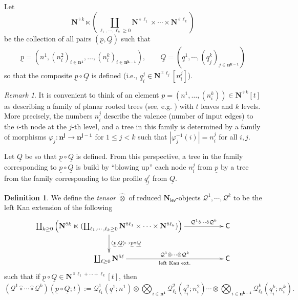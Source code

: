 \documentclass[11pt]{amsart}
\theoremstyle{definition}
\newtheorem{definition}[subsection]{Definition}
\theoremstyle{remark}
\newtheorem{remark}[subsection]{Remark}
\newcommand{\Cal}[1]{\mathcal{#1}}
\newcommand{\Ncirc}[1]{\mathbf{N}^{\hat{\circ}#1}}
\newcommand{\circhat}{\hat{\circ}}
\newcommand{\tensorhat}{\hat{\otimes}}
\newcommand{\Nl}{\mathbf{N}_{\mathsf{lev}}}
\begin{document}
Let \[\Ncirc{k} \ltimes \left(\coprod_{\ell_1,\cdots,\ell_k\geq 0}\Ncirc{\ell_1} \times \cdots \times \Ncirc{\ell_k}\right)\] be the collection of all pairs $(\underline{p}, \underline{Q})$ such that 
\begin{align*} 
\underline{p}=(n^1,(n^2_i)_{i\in\mathbf{n^1}},\dots,(n^k_i)_{i\in\mathbf{n^{k-1}}}), \quad \quad
\underline{Q}=(\underline{q}^1,\cdots ,(\underline{q}^k_j)_{j\in \mathbf{n^{k-1}}})
\end{align*}
so that the composite $\underline{p} \circ \underline{Q}$ is defined (i.e., $\underline{q}^j_i\in \Ncirc{\ell_j}[n^j_i]$).  

\begin{remark} \label{rem:trees-n-stuff}
    It is convenient to think of an element $\underline{p}=(n^1,\dots,(n^k_i))\in \Ncirc{k}[t]$ as describing a family of planar rooted trees (see, e.g. \cite{Ching-thesis}) with $t$ leaves and $k$ levels. More precisely, the numbers $n^j_i$ describe the valence (number of input edges) to the $i$-th node at the $j$-th level, and a tree in this family is determined by a family of morphisms $\varphi_j \colon \mathbf{n^j}\to\mathbf{n^{j-1}}$ for $1\leq j < k$ such that $|\varphi_j^{-1}(i)|=n_i^j$ for all $i,j$. %
    
    Let $\underline{Q}$ be so that $\underline{p}\circ \underline{Q}$ is defined. From this perspective, a tree in the family corresponding to $\underline{p}\circ\underline{Q}$ is build by ``blowing up'' each node $n^j_i$ from $\underline{p}$ by a tree from the family corresponding to the profile $\underline{q^j_i}$ from $\underline{Q}$.
\end{remark}

\begin{definition} \label{def:tensor} We define the \textit{tensor $\tensorhat$} of reduced $\Nl$-objects $\Cal{Q}^1,\cdots,\Cal{Q}^k$ to be the left Kan extension of the following \begin{equation} \xymatrix{ 
    \coprod_{k\geq 0} \left( \Ncirc{k} \ltimes (\coprod_{\ell_1,\cdots,\ell_k\geq 0}\Ncirc{\ell_1} \times \cdots \times \Ncirc{\ell_k}) \right) \ar[rr]^-{\Cal{Q}^1 \circhat \cdots \circhat \Cal{Q}^k} \ar[d]^-{(\underline{p}, \underline{Q}) \mapsto \underline{p} \circ \underline{Q}} 
    && \mathsf{C} 
    \\ \coprod_{\ell\geq 0} \mathbf{N}^{\circhat \ell} \ar[rr]^-{\Cal{Q}^1 \tensorhat \cdots \tensorhat \Cal{Q}^k}_-{\text{left Kan ext.}} 
    && \mathsf{C} }\end{equation}
such that if $\underline{p}\circ \underline{Q}\in \Ncirc{\ell_1+\cdots+\ell_k}[t]$, then \[  (\Cal{Q}^1 \circhat \cdots \circhat \Cal{Q}^k)(\underline{p}\circ \underline{Q}; t) :=  \Cal{Q}_{\ell_1}^1 (\underline{q}^1;n^1) \otimes \bigotimes_{i\in \mathbf{n^1}} \Cal{Q}_{\ell_2}^{2}(\underline{q}^2_i;n^2_i) \cdots \otimes \bigotimes_{i\in\mathbf{n^{k-1}}} \Cal{Q}^k_{\ell_k}(\underline{q}^k_i;n^k_i) . \]
\end{definition}
\end{document}
